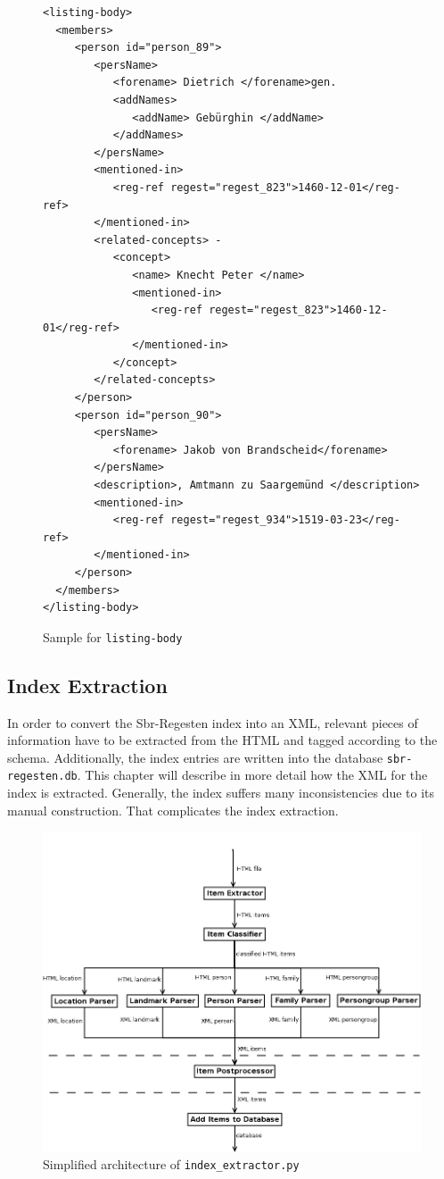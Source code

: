 \begin{figure}[H]
\centering
\begin{verbatim}
<listing-body>
  <members>
     <person id="person_89">
        <persName>
           <forename> Dietrich </forename>gen.
           <addNames>
              <addName> Gebürghin </addName>
           </addNames>
        </persName>
        <mentioned-in>
           <reg-ref regest="regest_823">1460-12-01</reg-ref>
        </mentioned-in>
        <related-concepts> -
           <concept>
              <name> Knecht Peter </name>
              <mentioned-in>
                 <reg-ref regest="regest_823">1460-12-01</reg-ref>
              </mentioned-in>
           </concept>
        </related-concepts>
     </person>
     <person id="person_90">
        <persName>
           <forename> Jakob von Brandscheid</forename>
        </persName>
        <description>, Amtmann zu Saargemünd </description>
        <mentioned-in>
           <reg-ref regest="regest_934">1519-03-23</reg-ref>
        </mentioned-in>
     </person>
  </members>
</listing-body>
\end{verbatim}
\caption{Sample for \texttt{listing-body}}
\label{fig:listing-body-xml}
\end{figure}


\subsection{Index Extraction}
In order to convert the Sbr-Regesten index into an XML, relevant pieces of information have to be extracted from the HTML and tagged according to the schema. Additionally, the index entries are written into the database \texttt{sbr-regesten.db}. This chapter will describe in more detail how the XML for the index is extracted. Generally, the index suffers many inconsistencies due to its manual construction. That complicates the index extraction.


\begin{figure}[h]
  \centering
  \includegraphics[scale=0.5]{img/index-extractor}
  \caption{Simplified architecture of \texttt{index\_extractor.py}}
  \label{fig:index-extractor}
\end{figure}


